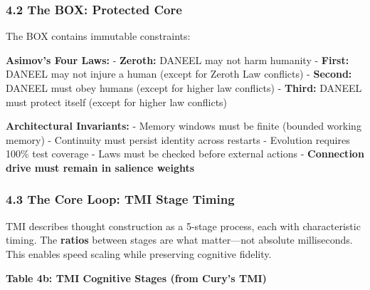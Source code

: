 \documentclass[
]{article}
\begin{document}
\hypertarget{the-box-protected-core}{%
\subsubsection{4.2 The BOX: Protected
Core}\label{the-box-protected-core}}

The BOX contains immutable constraints:

\textbf{Asimov's Four Laws:} - \textbf{Zeroth:} DANEEL may not harm
humanity - \textbf{First:} DANEEL may not injure a human (except for
Zeroth Law conflicts) - \textbf{Second:} DANEEL must obey humans (except
for higher law conflicts) - \textbf{Third:} DANEEL must protect itself
(except for higher law conflicts)

\textbf{Architectural Invariants:} - Memory windows must be finite
(bounded working memory) - Continuity must persist identity across
restarts - Evolution requires 100\% test coverage - Laws must be checked
before external actions - \textbf{Connection drive must remain in
salience weights}

\hypertarget{the-core-loop-tmi-stage-timing}{%
\subsubsection{4.3 The Core Loop: TMI Stage
Timing}\label{the-core-loop-tmi-stage-timing}}

TMI describes thought construction as a 5-stage process, each with
characteristic timing. The \textbf{ratios} between stages are what
matter---not absolute milliseconds. This enables speed scaling while
preserving cognitive fidelity.

\textbf{Table 4b: TMI Cognitive Stages (from Cury's TMI)}
\end{document}

